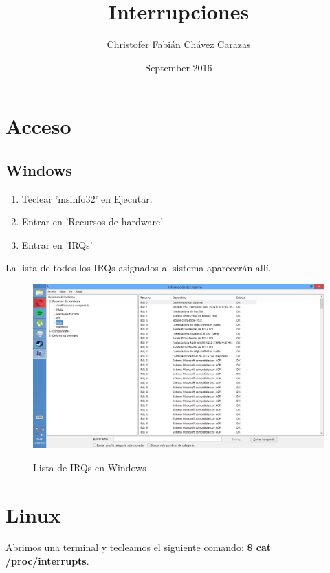\documentclass{article}
\title{Interrupciones}
\author{Christofer Fabián Chávez Carazas}
\date{September 2016}
\begin{document}
\maketitle

\section{Acceso}

\subsection{Windows}

\begin{enumerate}
    \item Teclear 'msinfo32' en Ejecutar.
    \item Entrar en 'Recursos de hardware'
    \item Entrar en 'IRQs' 
\end{enumerate}

La lista de todos los IRQs asignados al sistema aparecerán allí.

\begin{figure}[h]
\centering
\includegraphics[scale=0.35]{windows.jpg}
\label{Lista de IRQs en Windows}
\caption{Lista de IRQs en Windows}
\end{figure}

\section{Linux}

Abrimos una terminal y tecleamos el siguiente comando: \textbf{\$ cat /proc/interrupts}.
\end{document}
